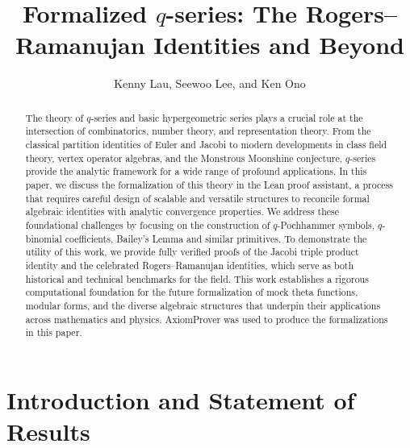 \documentclass[12pt]{amsart}
\title[The Rogers--Ramanujan identities]{
Formalized $q$-series: The Rogers--Ramanujan Identities and Beyond}
\author{Kenny Lau, Seewoo Lee, and Ken Ono}
\theoremstyle{definition}
\theoremstyle{remark}
\numberwithin{equation}{subsection}
\begin{document}
\begin{abstract} The theory of $q$-series and basic hypergeometric series plays a crucial role at the intersection of combinatorics, number theory, and representation theory. From the classical partition identities of Euler and Jacobi to modern developments in class field theory, vertex operator algebras, and the Monstrous Moonshine conjecture, $q$-series provide the analytic framework for a wide range of profound applications. In this paper, we discuss the formalization of this theory in the Lean proof assistant, a process that requires careful design of scalable and versatile structures to reconcile formal algebraic identities with analytic convergence properties. We address these foundational challenges by focusing on the construction of $q$-Pochhammer symbols, $q$-binomial coefficients, Bailey's Lemma and similar primitives. To demonstrate the utility of this work, we provide fully verified proofs of the Jacobi triple product identity and the celebrated Rogers--Ramanujan identities, which serve as both historical and technical benchmarks for the field. This work establishes a rigorous computational foundation for the future formalization of mock theta functions, modular forms, and the diverse algebraic structures that underpin their applications across mathematics and physics. AxiomProver was used to produce the formalizations in this paper.
\end{abstract}

\maketitle


\begin{center}
\end{center}


\section{Introduction and Statement of Results}
\end{document}
